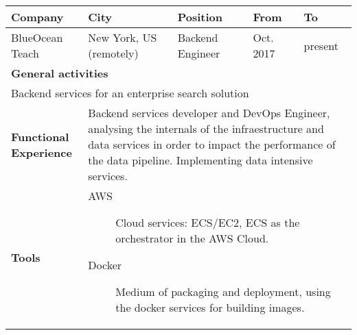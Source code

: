 


\begin{cventries}

 \begin{tabular}{|p{4.5cm} | p{2cm} | p{4cm} | p{2cm} | p{2cm}|}
    \hline
    \textbf{Company} & 
    \textbf{City} & 
    \textbf{Position} & 
    \textbf{From} & \textbf{To} \\
    \hline

    BlueOcean Teach & 
    New York, US \hspace{1cm} (remotely) & 
    Backend Engineer & 
    
    Oct. 2017 & present \\ 
    
    \hline

    \multicolumn{5}{|l|}{\textbf{General activities}} \\

     \multicolumn{5}{|p{15cm}|}{
       Backend services for an enterprise search solution
       } \\
    \hline
    \textbf{Functional Experience} & \multicolumn{4}{p{12cm}|}{
     
     Backend services developer and DevOps Engineer, analysing the internals of the infraestructure and data services in order to impact the performance of the data pipeline. Implementing data intensive services.
      
      } \\
      \hline
      \textbf{Tools} & \multicolumn{4}{p{12cm}|}{
                       \begin{description}
                       
                        \item[AWS] Cloud services: ECS/EC2, ECS as the orchestrator in the AWS Cloud.

                        \item[Docker] Medium of packaging and deployment, using the docker services for building images.


\end{description}}
\end{tabular}
\end{cventries}
